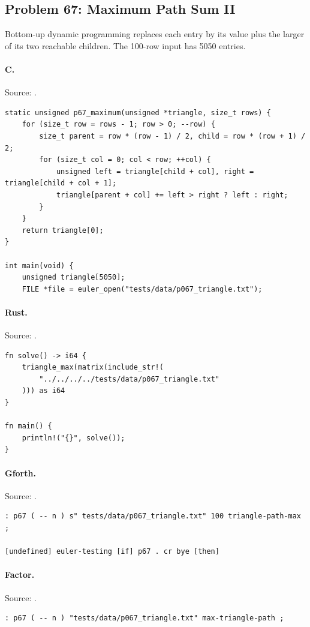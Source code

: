 \subsection{Problem 67: Maximum Path Sum II}
\label{walkthrough:p67}
Bottom-up dynamic programming replaces each entry by its value plus the larger of its two reachable children. The 100-row input has 5050 entries.

\paragraph{C.} Source: .
\begin{lstlisting}
static unsigned p67_maximum(unsigned *triangle, size_t rows) {
    for (size_t row = rows - 1; row > 0; --row) {
        size_t parent = row * (row - 1) / 2, child = row * (row + 1) / 2;
        for (size_t col = 0; col < row; ++col) {
            unsigned left = triangle[child + col], right = triangle[child + col + 1];
            triangle[parent + col] += left > right ? left : right;
        }
    }
    return triangle[0];
}

int main(void) {
    unsigned triangle[5050];
    FILE *file = euler_open("tests/data/p067_triangle.txt");
\end{lstlisting}

\paragraph{Rust.} Source: .
\begin{lstlisting}
fn solve() -> i64 {
    triangle_max(matrix(include_str!(
        "../../../../tests/data/p067_triangle.txt"
    ))) as i64
}

fn main() {
    println!("{}", solve());
}
\end{lstlisting}

\paragraph{Gforth.} Source: .
\begin{lstlisting}
: p67 ( -- n ) s" tests/data/p067_triangle.txt" 100 triangle-path-max ;

[undefined] euler-testing [if] p67 . cr bye [then]
\end{lstlisting}

\paragraph{Factor.} Source: .
\begin{lstlisting}
: p67 ( -- n ) "tests/data/p067_triangle.txt" max-triangle-path ;
\end{lstlisting}


